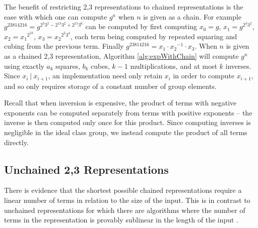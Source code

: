 \documentclass{ucalgthes1}
\theoremstyle{definition}
\begin{document}
The benefit of restricting 2,3 representations to chained representations is the ease with which one can compute $g^n$ when $n$ is given as a chain.  For example $g^{23814216} = g^{2^3 3^2 - 2^{13} 3^2 + 2^{15} 3^6}$ can be computed by first computing $x_0 = g$, $x_1 = g^{2^3 3^2}$, $x_2 = {x_1}^{2^{10}}$, $x_3 = {x_2}^{2^2 3^4}$, each term being computed by repeated squaring and cubing from the previous term.  Finally $g^{23814216} = x_1 \cdot {x_2}^{-1} \cdot x_3$.  When $n$ is given as a chained 2,3 representation, Algorithm \ref{alg:expWithChain} will compute $g^n$ using exactly $a_k$ squares, $b_k$  cubes, $k-1$ multiplications, and at most $k$ inverses.  Since $x_i ~|~ x_{i+1}$, an implementation need only retain $x_i$ in order to compute $x_{i+1}$, and so only requires storage of a constant number of group elements.

Recall that when inversion is expensive, the product of terms with negative exponents can be computed separately from terms with positive exponents -- the inverse is then computed only once for this product.  Since computing inverses is negligible in the ideal class group, we instead compute the product of all terms directly.


\subsection{Unchained 2,3 Representations}
\label{subsec:dbnsReps}

There is evidence \cite{Imbert2010} that the shortest possible chained representations require a linear number of terms in relation to the size of the input.  This is in contrast to unchained representations for which there are algorithms where the number of terms in the representation is provably sublinear in the length of the input \cite{Dimitrov2008, Ciet2005}.
\end{document}
